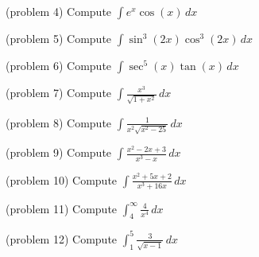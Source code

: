 \documentclass[handout]{ximera}
\begin{document}
\begin{problem}(problem 4)
Compute $\displaystyle \int e^x \cos(x) \, dx$

\end{problem}

\begin{problem}(problem 5)
Compute $\displaystyle \int \sin^3(2x) \cos^3(2x) \, dx$

\end{problem}

\begin{problem}(problem 6)
Compute $\displaystyle \int \sec^5(x) \tan(x)  \, dx$

\end{problem}

\begin{problem}(problem 7)
Compute $\displaystyle \int \frac{x^3}{ \sqrt{1+x^2}} \, dx$

\end{problem}

\begin{problem}(problem 8)
Compute $\displaystyle \int \frac{1}{x^2 \sqrt{x^2 - 25}} \, dx$

\end{problem}

\begin{problem}(problem 9)
Compute $\displaystyle \int \frac{x^2 - 2x+3}{x^3-x} \, dx$

\end{problem}

\begin{problem}(problem 10)
Compute $\displaystyle \int \frac{x^2 + 5x + 2}{x^3 + 16x} \, dx$

\end{problem}

\begin{problem}(problem 11)
Compute $\displaystyle \int_4^\infty \frac{4}{x^4} \, dx$

\end{problem}

\begin{problem}(problem 12)
Compute $\displaystyle \int_1^5 \frac{3}{\sqrt{x-1}} \, dx$
\end{problem}
\end{document}
